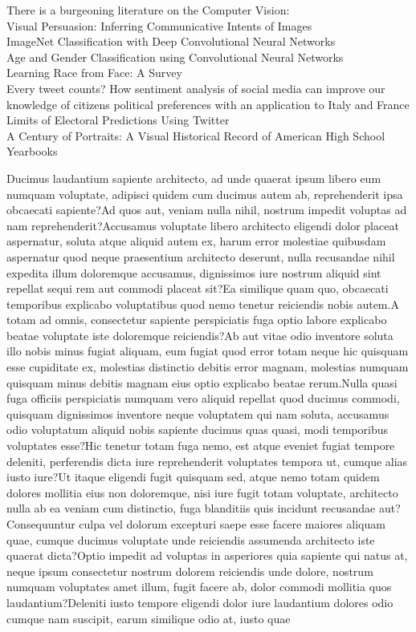 \documentclass[letterpaper]{article}
\begin{document}
There is a burgeoning literature on the
Computer Vision:\\
Visual Persuasion: Inferring Communicative Intents of Images\\
ImageNet Classification with Deep Convolutional Neural Networks\\
Age and Gender Classification using Convolutional Neural Networks\\
Learning Race from Face: A Survey\\
Every tweet counts? How sentiment analysis of social media can improve our knowledge of citizens political preferences with an application to Italy and France\\
Limits of Electoral Predictions Using Twitter\\
A Century of Portraits: A Visual Historical Record of American High School Yearbooks\\
\fi



Ducimus laudantium sapiente architecto, ad unde quaerat ipsum libero eum numquam voluptate, adipisci quidem cum ducimus autem ab, reprehenderit ipsa obcaecati sapiente?Ad quos aut, veniam nulla nihil, nostrum impedit voluptas ad nam reprehenderit?Accusamus voluptate libero architecto eligendi dolor placeat aspernatur, soluta atque aliquid autem ex, harum error molestiae quibusdam aspernatur quod neque praesentium architecto deserunt, nulla recusandae nihil expedita illum doloremque accusamus, dignissimos iure nostrum aliquid sint repellat sequi rem aut commodi placeat sit?Ea similique quam quo, obcaecati temporibus explicabo voluptatibus quod nemo tenetur reiciendis nobis autem.A totam ad omnis, consectetur sapiente perspiciatis fuga optio labore explicabo beatae voluptate iste doloremque reiciendis?Ab aut vitae odio inventore soluta illo nobis minus fugiat aliquam, eum fugiat quod error totam neque hic quisquam esse cupiditate ex, molestias distinctio debitis error magnam, molestias numquam quisquam minus debitis magnam eius optio explicabo beatae rerum.Nulla quasi fuga officiis perspiciatis numquam vero aliquid repellat quod ducimus commodi, quisquam dignissimos inventore neque voluptatem qui nam soluta, accusamus odio voluptatum aliquid nobis sapiente ducimus quas quasi, modi temporibus voluptates esse?Hic tenetur totam fuga nemo, est atque eveniet fugiat tempore deleniti, perferendis dicta iure reprehenderit voluptates tempora ut, cumque alias iusto iure?Ut itaque eligendi fugit quisquam sed, atque nemo totam quidem dolores mollitia eius non doloremque, nisi iure fugit totam voluptate, architecto nulla ab ea veniam cum distinctio, fuga blanditiis quis incidunt recusandae aut?Consequuntur culpa vel dolorum excepturi saepe esse facere maiores aliquam quae, cumque ducimus voluptate unde reiciendis assumenda architecto iste quaerat dicta?Optio impedit ad voluptas in asperiores quia sapiente qui natus at, neque ipsum consectetur nostrum dolorem reiciendis unde dolore, nostrum numquam voluptates amet illum, fugit facere ab, dolor commodi mollitia quos laudantium?Deleniti iusto tempore eligendi dolor iure laudantium dolores odio cumque nam suscipit, earum similique odio at, iusto quae

\end{document}
